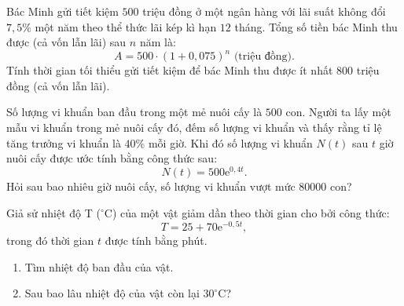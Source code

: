 \begin{bt}
	Bác Minh gửi tiết kiệm $500$ triệu đồng ở một ngân hàng với lãi suất không đổi $7{,}5 \%$ một năm theo thể thức lãi kép kì hạn $12$ tháng. Tổng số tiền bác Minh thu được (cả vốn lẫn lãi) sau $n$ năm là:
	$$A=500 \cdot(1+0{,}075)^n \text { (triệu đồng).}$$
	Tính thời gian tối thiểu gửi tiết kiệm để bác Minh thu được ít nhất $800$ triệu đồng (cả vốn lẫn lãi).
\end{bt}	

\begin{bt}
	Số lượng vi khuẩn ban đầu trong một mẻ nuôi cấy là $500$ con. Người ta lấy một mẫu vi khuẩn trong mẻ nuôi cấy đó, đếm số lượng vi khuẩn và thấy rằng tỉ lệ tăng trưởng vi khuẩn là $40 \%$ mỗi giờ. Khi đó số lượng vi khuẩn $N(t)$ sau $t$ giờ nuôi cấy được ước tính bằng công thức sau:
	$$N(t)=500\mathrm{e}^{0{,}4t}.$$
	Hỏi sau bao nhiêu giờ nuôi cấy, số lượng vi khuẩn vượt mức $80000$ con?
\end{bt}

\begin{bt}
	Giả sử nhiệt độ T ($^{\circ}$C) của một vật giảm dần theo thời gian cho bởi công thức:
	$$T=25+70\mathrm{e}^{-0{,}5t},$$ trong đó thời gian $t$ được tính bằng phút.
	\begin{enumerate}
		\item Tìm nhiệt độ ban đầu của vật.
		\item Sau bao lâu nhiệt độ của vật còn lại $30^{\circ}$C?
	\end{enumerate}
\end{bt}

